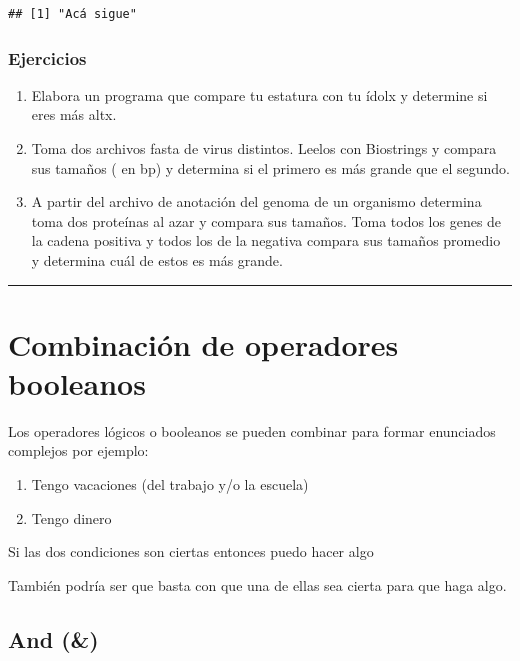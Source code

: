 \documentclass[
]{book}
\providecommand{\tightlist}{%
  \setlength{\itemsep}{0pt}\setlength{\parskip}{0pt}}
\begin{document}
\begin{verbatim}
## [1] "Acá sigue"
\end{verbatim}

\hypertarget{ejercicios-1}{%
\subsubsection{Ejercicios}\label{ejercicios-1}}

\begin{enumerate}
\def\labelenumi{\arabic{enumi}.}
\tightlist
\item
  Elabora un programa que compare tu estatura con tu ídolx y determine si eres más altx.
\item
  Toma dos archivos fasta de virus distintos. Leelos con Biostrings y compara sus tamaños ( en bp) y determina si el primero es más grande que el segundo.
\item
  A partir del archivo de anotación del genoma de un organismo determina toma dos proteínas al azar y compara sus tamaños. Toma todos los genes de la cadena positiva y todos los de la negativa compara sus tamaños promedio y determina cuál de estos es más grande.
\end{enumerate}

\begin{center}\rule{0.5\linewidth}{0.5pt}\end{center}

\hypertarget{combinaciuxf3n-de-operadores-booleanos}{%
\section{Combinación de operadores booleanos}\label{combinaciuxf3n-de-operadores-booleanos}}

Los operadores lógicos o booleanos se pueden combinar para formar enunciados complejos por ejemplo:

\begin{enumerate}
\def\labelenumi{\arabic{enumi}.}
\tightlist
\item
  Tengo vacaciones (del trabajo y/o la escuela)
\item
  Tengo dinero
\end{enumerate}

Si las dos condiciones son ciertas entonces puedo hacer algo

También podría ser que basta con que una de ellas sea cierta para que haga algo.

\hypertarget{and}{%
\subsection{And (\&)}\label{and}}
\end{document}
